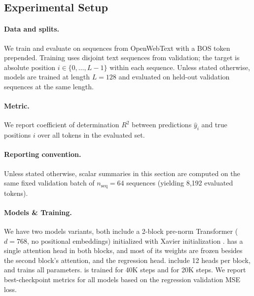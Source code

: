 \documentclass{article}
\theoremstyle{plain}
\theoremstyle{definition}
\theoremstyle{remark}
\begin{document}
\subsection{Experimental Setup}
\paragraph{Data and splits.}
We train and evaluate on sequences from OpenWebText \citep{} with a BOS token prepended.
Training uses disjoint text sequences from validation; the target is absolute position $i\in\{0,\dots,L{-}1\}$ within each sequence.
Unless stated otherwise, models are trained at length $L=128$ and evaluated on held-out validation sequences at the same length.

\paragraph{Metric.}
We report coefficient of determination $R^2$ between predictions $\hat y_i$ and true positions $i$ over all tokens in the evaluated set.

\paragraph{Reporting convention.}
Unless stated otherwise, scalar summaries in this section are computed on the same fixed validation batch of $n_{\text{seq}}=64$ sequences (yielding 8,192 evaluated tokens).

\paragraph{Models \& Training.}
We have two models variants, both include a 2-block pre-norm Transformer ($d=768$, no positional embeddings) 
initialized with Xavier initialization \citep{glorot2010understanding}.
\modelminimal has a single attention head in both blocks, and most of its weights are frozen besides the second block's attention, and the regression head.
\modelfull include 12 heads per block, and trains all parameters.
\modelminimal is trained for 40K steps and \modelfull for 20K steps. 
We report best-checkpoint metrics for all models based on the regression validation MSE loss.
\end{document}
